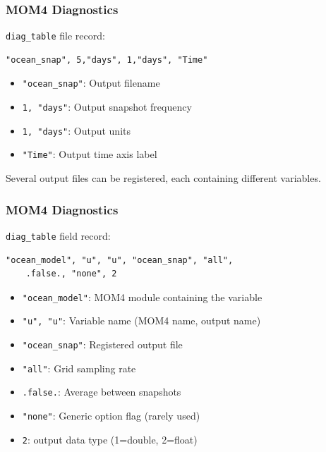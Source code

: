 \documentclass{beamer}
\begin{document}
\begin{frame}[fragile]
    \frametitle{MOM4 Diagnostics}
    
    \lstinline|diag_table| file record:
    \begin{lstlisting}
"ocean_snap", 5,"days", 1,"days", "Time"
    \end{lstlisting}
    \begin{itemize}
        \item \lstinline|"ocean_snap"|: Output filename
        \item \lstinline|1, "days"|: Output snapshot frequency
        \item \lstinline|1, "days"|: Output units
        \item \lstinline|"Time"|: Output time axis label
    \end{itemize}
    Several output files can be registered, each containing different
    variables.
\end{frame}

\begin{frame}[fragile]
    \frametitle{MOM4 Diagnostics}
    
    \lstinline|diag_table| field record:
    \begin{lstlisting}
"ocean_model", "u", "u", "ocean_snap", "all",
    .false., "none", 2
    \end{lstlisting}
    \begin{itemize}
        \item \lstinline|"ocean_model"|: MOM4 module containing the variable
        \item \lstinline|"u", "u"|: Variable name (MOM4 name, output name)
        \item \lstinline|"ocean_snap"|: Registered output file
        \item \lstinline|"all"|: Grid sampling rate
        \item \lstinline|.false.|: Average between snapshots
        \item \lstinline|"none"|: Generic option flag (rarely used)
        \item \lstinline|2|: output data type (1=double, 2=float)
    \end{itemize}
\end{frame}
\end{document}
